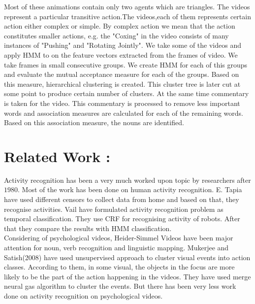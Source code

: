 \documentclass[10pt, twocolumn]{article}
\begin{document}
\hspace*{10pt} Most of these animations contain only two agents which are triangles. The videos represent a particular transitive action.The videos,each of them represents certain action either complex or simple. By complex action we mean that the action constitutes smaller actions, e.g. the "Coxing" in the video consists of many instances of "Pushing" and "Rotating Jointly". We take some of the videos and apply HMM to on the feature vectors extracted from the frames of video. We take frames in small consecutive groups. We create HMM for each of this groups and evaluate the mutual acceptance measure for each of the groups. Based on this measure, hierarchical clustering is created. This cluster tree is later cut at some point to produce certain number of clusters.
\hspace*{10pt} At the same time commentary is taken for the video. This commentary is processed to remove less important words and association measures are calculated for each of the remaining words. Based on this association measure, the nouns are identified.

\section*{Related Work :}
Activity recognition has been a very much worked upon topic by researchers after $1980$. Most of the work has been done on human activity recognition. E. Tapia \cite{TapiaIL04} have used different censors to collect data from home and based on that, they recognise activities. Vail \cite{VailVL07} have formulated activity recognition problem as temporal classification. They use CRF for recognising activity of robots. After that they compare the results with HMM classification.\\
\hspace*{10pt} Considering of psychological videos, Heider-Simmel Videos \cite{heider} have been major attention for noun, verb recognition and linguistic mapping. Mukerjee and Satish(2008)\cite{satish-mukerjee-2008icdl} have used unsupervised approach to cluster visual events into action classes. According to them, in some visual, the objects in the focus are more likely to be the part of the action happening in the videos. They have used merge neural gas algorithm to cluster the events. But there has been very less work done on activity recognition on psychological videos. 
\end{document}
